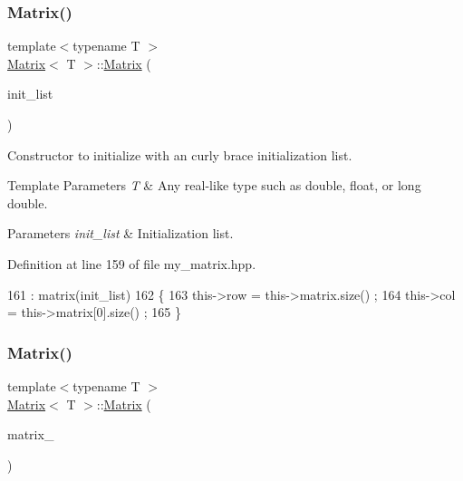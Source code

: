 \subsubsection{\texorpdfstring{Matrix()}{Matrix()}\hspace{0.1cm}{\footnotesize\ttfamily [3/5]}}
{\footnotesize\ttfamily template$<$typename T $>$ \\
\hyperlink{classMatrix}{Matrix}$<$ T $>$\+::\hyperlink{classMatrix}{Matrix} (\begin{DoxyParamCaption}\item[{std\+::initializer\+\_\+list$<$ std\+::vector$<$ T $>$$>$}]{init\+\_\+list }\end{DoxyParamCaption})}



Constructor to initialize with an curly brace initialization list. 


\begin{DoxyTemplParams}{Template Parameters}
{\em T} & Any real-\/like type such as double, float, or long double. \\
\hline
\end{DoxyTemplParams}

\begin{DoxyParams}{Parameters}
{\em init\+\_\+list} & Initialization list. \\
\hline
\end{DoxyParams}


Definition at line 159 of file my\+\_\+matrix.\+hpp.


\begin{DoxyCode}
161         : matrix(init\_list) 
162         \{
163             this->row = this->matrix.size() ; 
164             this->col = this->matrix[0].size() ;
165         \}
\end{DoxyCode}
\mbox{\label{classMatrix_aace9a20f83d726ffb813fe40ea16bf84}} 
\subsubsection{\texorpdfstring{Matrix()}{Matrix()}\hspace{0.1cm}{\footnotesize\ttfamily [4/5]}}
{\footnotesize\ttfamily template$<$typename T $>$ \\
\hyperlink{classMatrix}{Matrix}$<$ T $>$\+::\hyperlink{classMatrix}{Matrix} (\begin{DoxyParamCaption}\item[{std\+::vector$<$ std\+::vector$<$ T $>$$>$}]{matrix\+\_\+ }\end{DoxyParamCaption})}



